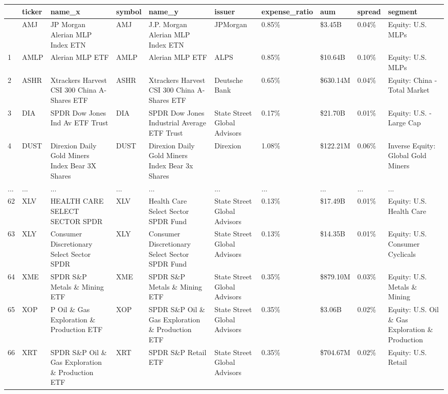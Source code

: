 \documentclass[
  letterpaper,
  DIV=11,
  numbers=noendperiod]{scrreprt}
\begin{document}
\begin{longtable}[]{@{}llllllllll@{}}
\toprule\noalign{}
& ticker & name\_x & symbol & name\_y & issuer & expense\_ratio & aum &
spread & segment \\
\midrule\noalign{}
\endhead
\bottomrule\noalign{}
\endlastfoot
0 & AMJ & JP Morgan Alerian MLP Index ETN & AMJ & J.P. Morgan Alerian
MLP Index ETN & JPMorgan & 0.85\% & \$3.45B & 0.04\% & Equity: U.S.
MLPs \\
1 & AMLP & Alerian MLP ETF & AMLP & Alerian MLP ETF & ALPS & 0.85\% &
\$10.64B & 0.10\% & Equity: U.S. MLPs \\
2 & ASHR & Xtrackers Harvest CSI 300 China A-Shares ETF & ASHR &
Xtrackers Harvest CSI 300 China A-Shares ETF & Deutsche Bank & 0.65\% &
\$630.14M & 0.04\% & Equity: China - Total Market \\
3 & DIA & SPDR Dow Jones Ind Av ETF Trust & DIA & SPDR Dow Jones
Industrial Average ETF Trust & State Street Global Advisors & 0.17\% &
\$21.70B & 0.01\% & Equity: U.S. - Large Cap \\
4 & DUST & Direxion Daily Gold Miners Index Bear 3X Shares & DUST &
Direxion Daily Gold Miners Index Bear 3x Shares & Direxion & 1.08\% &
\$122.21M & 0.06\% & Inverse Equity: Global Gold Miners \\
... & ... & ... & ... & ... & ... & ... & ... & ... & ... \\
62 & XLV & HEALTH CARE SELECT SECTOR SPDR & XLV & Health Care Select
Sector SPDR Fund & State Street Global Advisors & 0.13\% & \$17.49B &
0.01\% & Equity: U.S. Health Care \\
63 & XLY & Consumer Discretionary Select Sector SPDR & XLY & Consumer
Discretionary Select Sector SPDR Fund & State Street Global Advisors &
0.13\% & \$14.35B & 0.01\% & Equity: U.S. Consumer Cyclicals \\
64 & XME & SPDR S\&P Metals \& Mining ETF & XME & SPDR S\&P Metals \&
Mining ETF & State Street Global Advisors & 0.35\% & \$879.10M & 0.03\%
& Equity: U.S. Metals \& Mining \\
65 & XOP & P Oil \& Gas Exploration \& Production ETF & XOP & SPDR S\&P
Oil \& Gas Exploration \& Production ETF & State Street Global Advisors
& 0.35\% & \$3.06B & 0.02\% & Equity: U.S. Oil \& Gas Exploration \&
Production \\
66 & XRT & SPDR S\&P Oil \& Gas Exploration \& Production ETF & XRT &
SPDR S\&P Retail ETF & State Street Global Advisors & 0.35\% & \$704.67M
& 0.02\% & Equity: U.S. Retail \\
\end{longtable}
\end{document}
